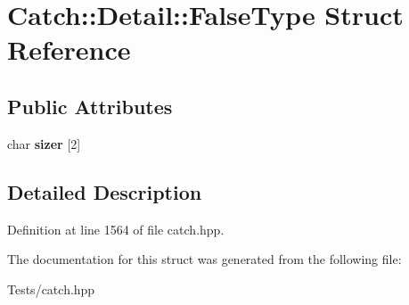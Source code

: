 \hypertarget{struct_catch_1_1_detail_1_1_false_type}{}\section{Catch\+:\+:Detail\+:\+:False\+Type Struct Reference}
\label{struct_catch_1_1_detail_1_1_false_type}
\subsection*{Public Attributes}
\begin{DoxyCompactItemize}
\item 
\mbox{\label{struct_catch_1_1_detail_1_1_false_type_abc1a730e197d6f7750ae8aaf47b63477}} 
char {\bfseries sizer} \mbox{[}2\mbox{]}
\end{DoxyCompactItemize}


\subsection{Detailed Description}


Definition at line 1564 of file catch.\+hpp.



The documentation for this struct was generated from the following file\+:\begin{DoxyCompactItemize}
\item 
Tests/catch.\+hpp\end{DoxyCompactItemize}
